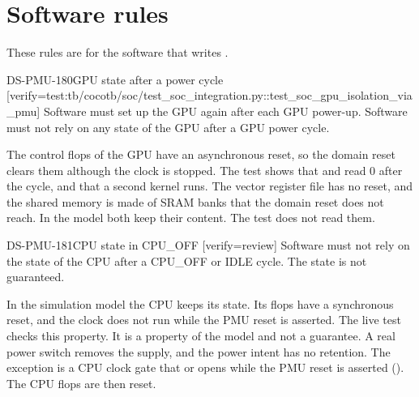 \section{Software rules}\label{ds:ch:mod-power-management:software}
These rules are for the software that writes .

\begin{requirement}{DS-PMU-180}{GPU state after a power cycle}
[verify={test:tb/cocotb/soc/test_soc_integration.py::test_soc_gpu_isolation_via_pmu}]
Software must set up the GPU again after each GPU power-up. Software must not rely on any state of the GPU after a GPU power cycle.
\end{requirement}
\begin{information}
The control flops of the GPU have an asynchronous reset, so the domain reset clears them although the clock is stopped. The test shows that  and  read 0 after the cycle, and that a second kernel runs. The vector register file has no reset, and the shared memory is made of SRAM banks that the domain reset does not reach. In the model both keep their content. The test does not read them.
\end{information}

\begin{requirement}{DS-PMU-181}{CPU state in CPU\_OFF}
[verify={review}]
Software must not rely on the state of the CPU after a CPU\_OFF or IDLE cycle. The state is not guaranteed.
\end{requirement}
\begin{information}
In the simulation model the CPU keeps its state. Its flops have a synchronous reset, and the clock does not run while the PMU reset is asserted. The live test checks this property. It is a property of the model and not a guarantee. A real power switch removes the supply, and the power intent has no retention. The exception is a CPU clock gate that  or  opens while the PMU reset is asserted (). The CPU flops are then reset.
\end{information}


